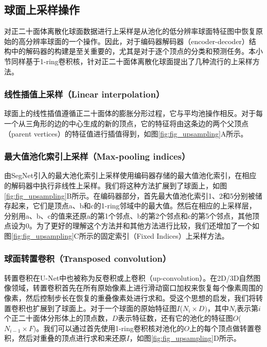 \subsection{球面上采样操作}
对正二十面体离散化球面数据进行上采样是从池化的低分辨率球面特征图中恢复原始的高分辨率球面的一个操作。因此，对于编码器解码器（encoder-decoder）结构\cite{badrinarayanan2017segnet}中的解码器的构建是至关重要的，尤其是对于逐个顶点的分类和预测任务。本小节同样基于1-ring卷积核，针对正二十面体离散化球面提出了几种流行的上采样方法。

\subsubsection{线性插值上采样（Linear interpolation）}
球面上的线性插值遵循正二十面体的膨胀分形过程，它与平均池操作相反。对于每一个从三角形的边的中心生成的新的顶点，它的特征将由这条边的两个父顶点（parent vertices）的特征值进行插值得到，如图\ref{fig:fig_upsampling}A所示。

\subsubsection{最大值池化索引上采样（Max-pooling indices）}
由SegNet\cite{badrinarayanan2017segnet}引入的最大池化索引上采样使用编码器存储的最大值池化索引，在相应的解码器中执行非线性上采样。我们将这种方法扩展到了球面上，如图\ref{fig:fig_upsampling}B所示。在编码器部分，首先最大值池化索引1、2和5分别被储存起来，它们是顶点a、b和c的1-ring邻域中的最大值。然后在相应的上采样层，分别用a、b、c的值来还原a的第1个邻点、b的第2个邻点和c的第5个邻点，其他顶点设为0。为了更好的理解这个方法并和其他方法进行比较，我们还增加了一个如图\ref{fig:fig_upsampling}C所示的固定索引（Fixed Indices）上采样方法。

\subsubsection{球面转置卷积（Transposed convolution）}
转置卷积在U-Net中也被称为反卷积或上卷积（up-convolution）\cite{ronneberger2015u}。在2D/3D自然图像领域，转置卷积首先在所有原始像素上进行滑动窗口加权来恢复每个像素周围的像素，然后控制步长在恢复的重叠像素处进行求和。受这个思想的启发，我们将转置卷积也扩展到了球面上。对于一个球面的原始特征图$I$($N_i\times D)$，其中$N_i$表示第$i$个正二十面体分形体上的顶点数，$D$表示特征数，还有它的池化的特征图$O$($N_{i-1}\times F)$。我们可以通过首先使用1-ring卷积核对池化的$O$上的每个顶点做转置卷积，然后对重叠的顶点进行求和来还原$I$，如图\ref{fig:fig_upsampling}D所示。

